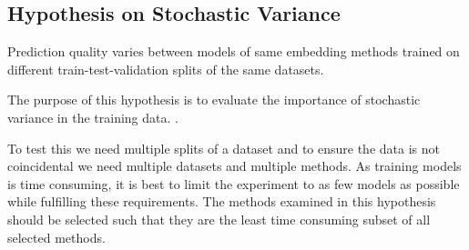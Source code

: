 \subsection{Hypothesis on Stochastic Variance}
\label{sec:hypothesis_stochastic_variance}

\begin{hypothesis}
\label{hyp:stochastic_variance}
Prediction quality varies between models of same embedding methods trained on different train-test-validation splits of the same datasets.
\end{hypothesis}

The purpose of this hypothesis is to evaluate the importance of stochastic variance in the training data. .

To test this we need multiple splits of a dataset and to ensure the data is not coincidental we need multiple datasets and multiple methods.
As training models is time consuming, it is best to limit the experiment to as few models as possible while fulfilling these requirements.
The methods examined in this hypothesis should be selected such that they are the least time consuming subset of all selected methods.